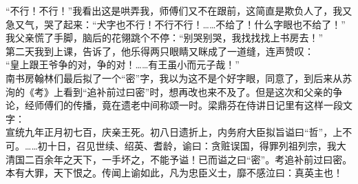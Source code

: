 “不行！不行！”我看出这是哄弄我，师傅们又不在跟前，这简直是欺负人了，我又急又气，哭了起来：“犬字也不行！不行不行！……不给了！什么字眼也不给了！”\\

我父亲慌了手脚，脑后的花翎跳个不停：“别哭别哭，我找找找上书房去！”\\

第二天我到上课，告诉了，他乐得两只眼睛又眯成了一道缝，连声赞叹：\\

“皇上跟王爷争的对，争的对！……有王虽小而元子哉！”\\

南书房翰林们最后拟了一个“密”字，我以为这不是个好字眼，同意了，到后来从苏洵的《考》上看到“追补前过曰密”时，想再改也来不及了。但是这次和父亲的争论，经师傅们的传播，竟在遗老中间称颂一时。梁鼎芬在侍讲日记里有这样一段文字：\\

宣统九年正月初七百，庆亲王死。初八日遗折上，内务府大臣拟旨谥曰“哲”，上不可。……初十日，召见世续、绍英、耆龄，谕曰：贪赃误国，得罪列祖列宗，我大清国二百余年之天下，一手坏之，不能予谥！已而谥之曰“密”。考追补前过曰密。本有大罪，天下恨之。传闻上谕如此，凡为忠臣义士，靡不感泣曰：真英主也！
